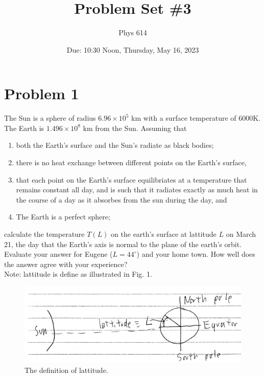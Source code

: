 \documentclass[12pt]{article}
\begin{document}
\title{Problem Set \#3}
\author{Phys 614}
\date{Due: 10:30 Noon, Thursday, May 16, 2023}
\maketitle

\section*{Problem 1}
The Sun is a sphere of radius $6.96 \times 10^5$ km with a surface temperature of 6000K. The Earth is $1.496 \times 10^8$ km from the Sun. Assuming that
\begin{enumerate}
    \item both the Earth's surface and the Sun's radiate as black bodies;
    \item there is no heat exchange between different points on the Earth's surface, 
    \item that each point on the Earth's surface equilibriates at a temperature that remains constant all day, and is such that it radiates exactly as much heat in the course of a day as it absorbes from the sun during the day, and
    \item The Earth is a perfect sphere;
\end{enumerate}
calculate the temperature $T(L)$ on the earth's surface at lattitude $L$ on March 21, the day that the Earth's axis is normal to the plane of the earth's orbit. Evaluate your answer for Eugene ($L=44^\circ$) and your home town. How well does the answer agree with your experience? \\
Note: lattitude is define as illustrated in Fig. 1.
\begin{figure}[H]
    \includegraphics{Problem1}
    \centering
    \caption{The definition of lattitude.}
\end{figure}
\end{document}
